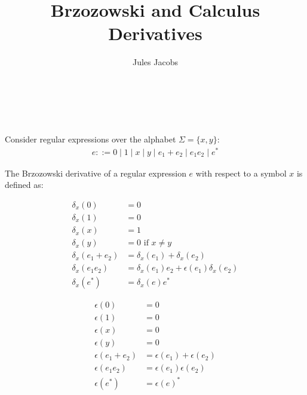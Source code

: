 \documentclass[a4paper, 11pt]{scrartcl}
\title{Brzozowski and Calculus Derivatives}
\author{Jules Jacobs}
\date{}
\makeatletter
\theoremstyle{definition}
\renewcommand\maketitle
  {
  \begin{center}
   {\color{black}\large\spacedallcaps{\@title}}\\\bigskip%
   \large{\@author}\\\medskip%
   \normalsize{\@date}\bigskip%
  \end{center}%
  }
\makeatother
\begin{document}
\maketitle

Consider regular expressions over the alphabet \(\Sigma = \{x,y\}\):
\begin{align*}
  e ::= 0 \mid 1 \mid x \mid y \mid e_1 + e_2 \mid e_1 e_2 \mid e^*
\end{align*}

The Brzozowski derivative of a regular expression $e$ with respect to a symbol $x$ is defined as:
\begin{minipage}{0.5\textwidth}
\begin{align*}
  \delta_x(0)         &= 0 \\
  \delta_x(1)         &= 0 \\
  \delta_x(x)         &= 1 \\
  \delta_x(y)         &= 0 \text{ if } x \neq y \\
  \delta_x(e_1 + e_2) &= \delta_x(e_1) + \delta_x(e_2) \\
  \delta_x(e_1 e_2)   &= \delta_x(e_1) e_2 + \epsilon(e_1) \delta_x(e_2) \\
  \delta_x(e^*)       &= \delta_x(e) e^*
\end{align*}
\end{minipage}
\begin{minipage}{0.5\textwidth}
\begin{align*}
  \epsilon(0) &= 0 \\
  \epsilon(1) &= 0 \\
  \epsilon(x) &= 0 \\
  \epsilon(y) &= 0 \\
  \epsilon(e_1 + e_2) &= \epsilon(e_1) + \epsilon(e_2) \\
  \epsilon(e_1 e_2) &= \epsilon(e_1) \epsilon(e_2) \\
  \epsilon(e^*) &= \epsilon(e)^*
\end{align*}
\end{minipage}
\end{document}
